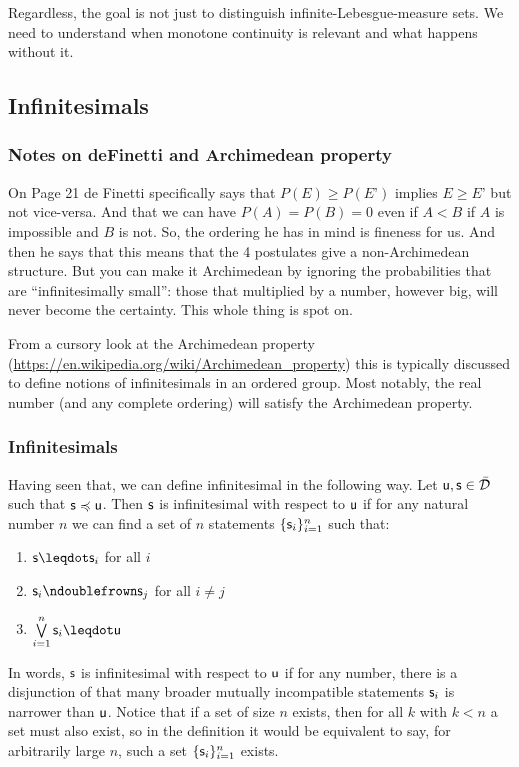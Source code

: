 \documentclass{article}
\begin{document}
Regardless, the goal is not just to distinguish infinite-Lebesgue-measure sets. We need to understand when monotone continuity is relevant and what happens without it. 

\subsection{Infinitesimals}

\subsubsection{Notes on deFinetti and Archimedean property }

On Page 21 de Finetti specifically says that $P(E) \geq P(E’)$ implies $E \geq E’$ but not vice-versa. And that we can have $P(A)=P(B)=0$ even if $A<B$ if $A$ is impossible and $B$ is not. So, the ordering he has in mind is fineness for us. And then he says that this means that the 4 postulates give a non-Archimedean structure. But you can make it Archimedean by ignoring the probabilities that are “infinitesimally small”: those that multiplied by a number, however big, will never become the certainty. This whole thing is spot on.

From a cursory look at the Archimedean property (\url{https://en.wikipedia.org/wiki/Archimedean_property})
this is typically discussed to define notions of infinitesimals in an ordered group. Most notably, the real number (and any complete ordering) will satisfy the Archimedean property.

\subsubsection{Infinitesimals}

Having seen that, we can define infinitesimal in the following way. Let $\stmt[u],\stmt[s] \in \tdomain$ such that $\stmt \narrower \stmt[u]$. Then $\stmt$ is infinitesimal with respect to $\stmt[u]$ if for any natural number $n$ we can find a set of $n$ statements $\{ \stmt_i \}_{i=1}^n$ such that:
\begin{enumerate}
    \item $\stmt \finer \stmt_i$ for all $i$
    \item $\stmt_i \ncomp \stmt_j$ for all $i \neq j$
    \item $\bigOR\limits_{i=1}^n \stmt_i \finer \stmt[u]$ 
\end{enumerate}
In words, $\stmt$ is infinitesimal with respect to $\stmt[u]$ if for any number, there is a disjunction of that many broader mutually incompatible statements $\stmt_i$ is narrower than $\stmt[u]$. Notice that if a set of size $n$ exists, then for all $k$ with $k<n$ a set must also exist, so in the definition it would be equivalent to say, for arbitrarily large $n$, such a set $\{ \stmt_i \}_{i=1}^n$ exists.
\end{document}
